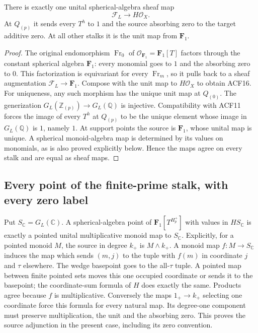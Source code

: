 \begin{proposition}
There is exactly one unital spherical-algebra sheaf map
\begin{equation}\tag{ACF16}
 \mathcal F_L\longrightarrow H\mathcal O_X.
\end{equation}
At $Q_{(p)}$ it sends every $T^h$ to $1$ and the source absorbing zero
to the target additive zero. At all other stalks it is the unit map from
$\mathbf F_1$.
\end{proposition}
\begin{proof}
The original endomorphism $\operatorname{Fr}_0$ of
$\mathcal O_{\mathbf F_1}=\mathbf F_1[T]$ factors through the constant
spherical algebra $\mathbf F_1$: every monomial goes to $1$ and the
absorbing zero to $0$. This factorization is equivariant for every
$\operatorname{Fr}_m$, so it pulls back to a sheaf augmentation
$\mathcal F_L\to\mathbf F_1$. Compose with the unit map to
$H\mathcal O_X$ to obtain ACF16.
For uniqueness, any such morphism has the unique unit map at $Q_{(0)}$.
The generization $G_L(\mathbb Z_{(p)})\to G_L(\mathbb Q)$ is injective.
Compatibility with ACF11 forces the image of every $T^h$ at $Q_{(p)}$
to be the unique element whose image in $G_L(\mathbb Q)$ is $1$,
namely $1$. At support points the source is $\mathbf F_1$, whose unital
map is unique. A spherical monoid-algebra map is determined by its
values on monomials, as is also proved explicitly below. Hence the
maps agree on every stalk and are equal as sheaf maps.
\end{proof}

\subsection{Every point of the finite-prime stalk, with every zero label}
Put $S_{\mathbb C}=G_L(\mathbb C)$. A spherical-algebra point of
$\mathbf F_1[T^{H_p^+}]$ with values in $HS_{\mathbb C}$ is exactly a
pointed unital multiplicative monoid map to $S_{\mathbb C}$.
Explicitly, for a pointed monoid $M$, the source in degree $k_+$ is
$M\wedge k_+$. A monoid map $f:M\to S_{\mathbb C}$ induces the map
which sends $(m,j)$ to the tuple with $f(m)$ in coordinate $j$ and
$\tau$ elsewhere. The wedge basepoint goes to the all-$\tau$ tuple.
A pointed map between finite pointed sets moves this one occupied
coordinate or sends it to the basepoint; the coordinate-sum formula of
$H$ does exactly the same. Products agree because $f$ is multiplicative.
Conversely the maps $1_+\to k_+$ selecting one coordinate force this
formula for every natural map. Its degree-one component must preserve
multiplication, the unit and the absorbing zero. This proves the
source adjunction in the present case, including its zero convention.

